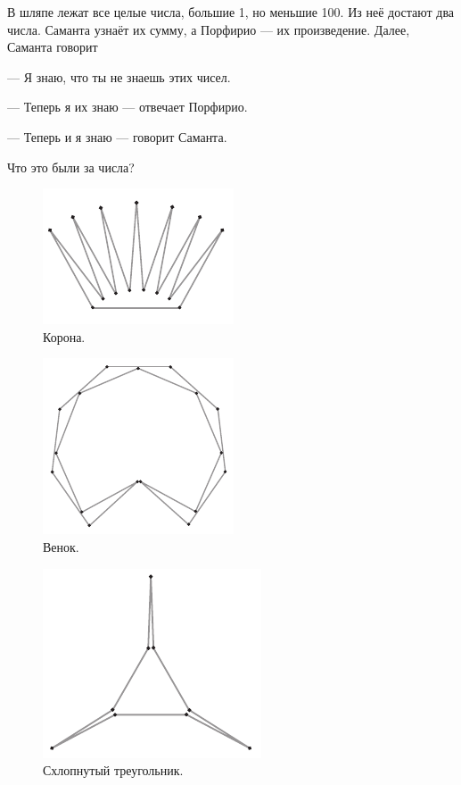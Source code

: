 В шляпе лежат все целые числа, большие 1, но меньшие 100.
Из неё достают два числа.
Саманта узнаёт их сумму, а Порфирио --- их произведение.
Далее, Саманта говорит

--- Я знаю, что ты не знаешь этих чисел.

--- Теперь я их знаю --- отвечает Порфирио.

--- Теперь и я знаю --- говорит Саманта.

Что это были за числа?

\begin{figure}[htb!]
\centering
\includegraphics[scale=.95]{pics/korona}
\caption{Корона.}
\label{pic:korona}
\end{figure}

\begin{figure}[htb!]
\centering
\includegraphics[scale=.95]{pics/wreath}
\caption{Венок.}
\label{pic:wreath}
\end{figure}

\begin{figure}[htb!]
\centering
\includegraphics[scale=.95]{pics/treug}
\caption{Схлопнутый треугольник.}
\label{pic:treug}
\end{figure}

